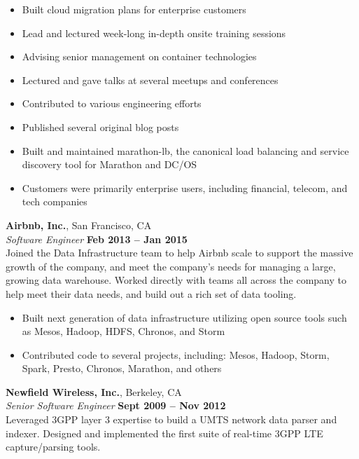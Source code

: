 \documentclass[margin,line]{resume}
\begin{document}
\begin{resume}
    \begin{itemize}
    \item Built cloud migration plans for enterprise customers
    \item Lead and lectured week-long in-depth onsite training sessions
    \item Advising senior management on container technologies
    \item Lectured and gave talks at several meetups and conferences
    \item Contributed to various engineering efforts
    \item Published several original blog posts
    \item Built and maintained marathon-lb, the canonical load balancing and
     service discovery tool for Marathon and DC/OS
    \item Customers were primarily enterprise users, including financial,
     telecom, and tech companies
    \end{itemize}

    \textbf{Airbnb, Inc.}, San Francisco, CA \vspace{2mm}\\\vspace{1mm}%
    \textsl{Software Engineer} \hfill \textbf{Feb 2013 -- Jan 2015}\\
    Joined the Data Infrastructure team to help Airbnb scale to support the
    massive growth of the company, and meet the company's needs for managing
    a large, growing data warehouse. Worked directly with teams all across
    the company to help meet their data needs, and build out a rich set of
    data tooling.

    \begin{itemize}
    \item Built next generation of data infrastructure utilizing open source
     tools such as Mesos, Hadoop, HDFS, Chronos, and Storm
    \item Contributed code to several projects, including: Mesos, Hadoop,
     Storm, Spark, Presto, Chronos, Marathon, and others
    \end{itemize}

    \textbf{Newfield Wireless, Inc.}, Berkeley, CA \vspace{2mm}\\\vspace{1mm}%
    \textsl{Senior Software Engineer} \hfill \textbf{Sept 2009 -- Nov 2012}\\
    Leveraged 3GPP layer 3 expertise to build a UMTS network data parser and
    indexer. Designed and implemented the first suite of real-time 3GPP LTE
    capture/parsing tools.


\end{resume}
\end{document}
